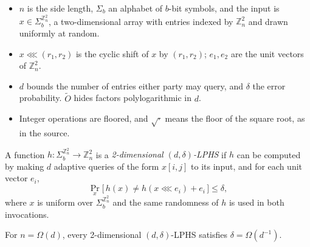 \documentclass{aicr-conjecture}
\newcommand{\Z}{\mathbb{Z}}
\newcommand{\Ot}{\widetilde{O}}
\newcommand{\Om}{\Omega}
\newcommand{\shift}{\lll}
\begin{document}
\begin{itemize}[nosep]
  \item $n$ is the side length, $\Sigma_{b}$ an alphabet of $b$-bit
    symbols, and the input is $x \in \Sigma_{b}^{\Z_{n}^{2}}$, a
    two-dimensional array with entries indexed by $\Z_{n}^{2}$ and
    drawn uniformly at random.
  \item $x \shift (r_{1}, r_{2})$ is the cyclic shift of $x$ by
    $(r_{1}, r_{2})$; $e_{1}, e_{2}$ are the unit vectors of
    $\Z_{n}^{2}$.
  \item $d$ bounds the number of entries either party may query, and
    $\delta$ the error probability. $\Ot$ hides factors polylogarithmic
    in $d$.
  \item Integer operations are floored, and $\sqrt{\cdot}$ means the
    floor of the square root, as in the source.
\end{itemize}

\begin{definition}\label{def:lphs}
A function $h : \Sigma_{b}^{\Z_{n}^{2}} \to \Z_{n}^{2}$ is a
\emph{2-dimensional $(d, \delta)$-LPHS} if $h$ can be computed by making
$d$ adaptive queries of the form $x[i,j]$ to its input, and for each
unit vector $e_{i}$,
\[
  \Pr_{x}\bigl[\, h(x) \ne h(x \shift e_{i}) + e_{i} \,\bigr]
  \le \delta,
\]
where $x$ is uniform over $\Sigma_{b}^{\Z_{n}^{2}}$ and the same
randomness of $h$ is used in both invocations.
\end{definition}

\begin{theorem}[The source's Theorem 1.4, at $k = 2$]\label{thm:lower}
For $n = \Om(d)$, every 2-dimensional $(d, \delta)$-LPHS satisfies
$\delta = \Om(d^{-1})$.
\end{theorem}
\end{document}
